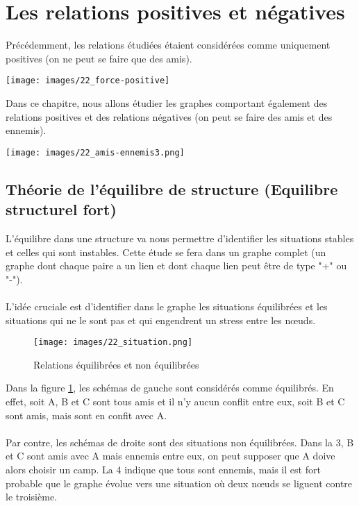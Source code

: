 \section{Les relations positives et négatives}

Précédemment, les relations étudiées étaient considérées comme uniquement positives (on ne peut se faire que des amis). 

\texttt{[image: images/22\_force-positive]}

Dans ce chapitre, nous allons étudier les graphes comportant également des relations positives et des relations négatives (on peut se faire des amis et des ennemis).

\texttt{[image: images/22\_amis-ennemis3.png]}

\subsection{Théorie de l'équilibre de structure (Equilibre structurel fort)}
L'équilibre dans une structure va nous permettre d'identifier les situations stables et celles qui sont instables. Cette étude se fera dans un graphe complet (un graphe dont chaque paire a un lien et dont chaque lien peut être de type "+" ou "-").

\paragraph{}
L'idée cruciale est d'identifier dans le graphe les situations équilibrées et les situations qui ne le sont pas et qui engendrent un stress entre les nœuds.  

\begin{figure}[h!]
\label{equi}
\caption{Relations équilibrées et non équilibrées}
\centering
\texttt{[image: images/22\_situation.png]}
\end{figure}


Dans la figure \ref{equi}, les schémas de gauche sont considérés comme équilibrés. En effet, soit A, B et C sont tous amis et il n'y aucun conflit entre eux, soit B et C sont amis, mais sont en confit avec A. 
\paragraph{}
Par contre, les schémas de droite sont des situations non équilibrées. Dans la 3, B et C sont amis avec A mais ennemis entre eux, on peut supposer que A doive alors choisir un camp. La 4 indique que tous sont ennemis, mais il est fort probable que le graphe évolue vers une situation où deux nœuds se liguent contre le troisième. 


